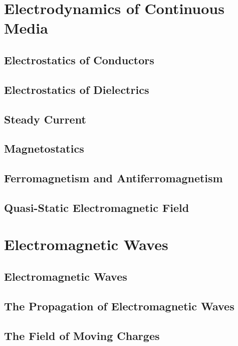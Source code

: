 \documentclass[
    ebook,
    11pt,
    twoside,
    onecolumn,
    openright,
    final
]{memoir}
\begin{document}
\part{Electrodynamics of Continuous Media}

\chapter{Electrostatics of Conductors}

\chapter{Electrostatics of Dielectrics}

\chapter{Steady Current}

\chapter{Magnetostatics}

\chapter{Ferromagnetism and Antiferromagnetism}

\chapter{Quasi-Static Electromagnetic Field}

\part{Electromagnetic Waves}

\chapter{Electromagnetic Waves}

\chapter{The Propagation of Electromagnetic Waves}

\chapter{The Field of Moving Charges}
\end{document}

